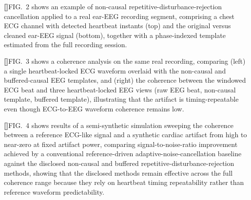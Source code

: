 \documentclass[12pt]{article}
\newcounter{para}
\newcommand{\parnum}{\stepcounter{para}\noindent\textbf{[\thepara]}\quad}
\begin{document}
\parnum FIG.~2 shows an example of non-causal repetitive-disturbance-rejection cancellation applied to a real ear-EEG recording segment, comprising a chest ECG channel with detected heartbeat instants (top) and the original versus cleaned ear-EEG signal (bottom), together with a phase-indexed template estimated from the full recording session.

\parnum FIG.~3 shows a coherence analysis on the same real recording, comparing (left) a single heartbeat-locked ECG waveform overlaid with the non-causal and buffered-causal EEG templates, and (right) the coherence between the windowed ECG beat and three heartbeat-locked EEG views (raw EEG beat, non-causal template, buffered template), illustrating that the artifact is timing-repeatable even though ECG-to-EEG waveform coherence remains low.

\parnum FIG.~4 shows results of a semi-synthetic simulation sweeping the coherence between a reference ECG-like signal and a synthetic cardiac artifact from high to near-zero at fixed artifact power, comparing signal-to-noise-ratio improvement achieved by a conventional reference-driven adaptive-noise-cancellation baseline against the disclosed non-causal and buffered repetitive-disturbance-rejection methods, showing that the disclosed methods remain effective across the full coherence range because they rely on heartbeat timing repeatability rather than reference waveform predictability.
\end{document}

